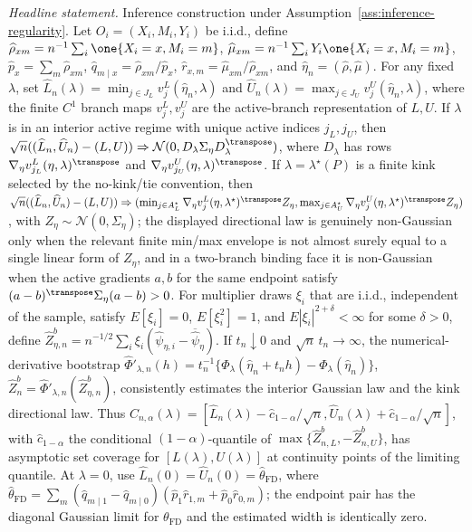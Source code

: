 \begin{proposition}\label{prop:inference-active-branch}
\emph{Headline statement.} Inference construction under Assumption~\ref{ass:inference-regularity}. Let \(O_i=(X_i,M_i,Y_i)\) be i.i.d., define \(\widehat\rho_{xm}=n^{-1}\sum_i\one\{X_i=x,M_i=m\}\), \(\widehat\mu_{xm}=n^{-1}\sum_iY_i\one\{X_i=x,M_i=m\}\), \(\widehat p_x=\sum_m\widehat\rho_{xm}\), \(\widehat q_{m\mid x}=\widehat\rho_{xm}/\widehat p_x\), \(\widehat r_{x,m}=\widehat\mu_{xm}/\widehat\rho_{xm}\), and \(\widehat\eta_n=(\widehat\rho,\widehat\mu)\). For any fixed \(\lambda\), set \(\widehat L_n(\lambda)=\min_{j\in J_L}v^L_j(\widehat\eta_n,\lambda)\) and \(\widehat U_n(\lambda)=\max_{j\in J_U}v^U_j(\widehat\eta_n,\lambda)\), where the finite \(C^1\) branch maps \(v^L_j,v^U_j\) are the active-branch representation of \(L,U\). If \(\lambda\) is in an interior active regime with unique active indices \(j_L,j_U\), then \(\sqrt n((\widehat L_n,\widehat U_n)-(L,U))\Rightarrow \mathcal N(0,D_\lambda\Sigma_\eta D_\lambda^\transpose)\), where \(D_\lambda\) has rows \(\nabla_\eta v^L_{j_L}(\eta,\lambda)^\transpose\) and \(\nabla_\eta v^U_{j_U}(\eta,\lambda)^\transpose\). If \(\lambda=\lambda^\star(P)\) is a finite kink selected by the no-kink/tie convention, then \(\sqrt n((\widehat L_n,\widehat U_n)-(L,U))\Rightarrow(\min_{j\in A_L^\star}\nabla_\eta v^L_j(\eta,\lambda^\star)^\transpose Z_\eta,\max_{j\in A_U^\star}\nabla_\eta v^U_j(\eta,\lambda^\star)^\transpose Z_\eta)\), with \(Z_\eta\sim\mathcal N(0,\Sigma_\eta)\); the displayed directional law is genuinely non-Gaussian only when the relevant finite min/max envelope is not almost surely equal to a single linear form of \(Z_\eta\), and in a two-branch binding face it is non-Gaussian when the active gradients \(a,b\) for the same endpoint satisfy \((a-b)^\transpose\Sigma_\eta(a-b)>0\). For multiplier draws \(\xi_i\) that are i.i.d., independent of the sample, satisfy \(E[\xi_i]=0\), \(E[\xi_i^2]=1\), and \(E|\xi_i|^{2+\delta}<\infty\) for some \(\delta>0\), define \(\widehat Z_{\eta,n}^b=n^{-1/2}\sum_i\xi_i(\widehat\psi_{\eta,i}-\overline{\widehat\psi}_\eta)\). If \(t_n\downarrow0\) and \(\sqrt n\,t_n\to\infty\), the numerical-derivative bootstrap \(\widehat\Phi'_{\lambda,n}(h)=t_n^{-1}\{\Phi_\lambda(\widehat\eta_n+t_nh)-\Phi_\lambda(\widehat\eta_n)\}\), \(\widehat Z_n^b=\widehat\Phi'_{\lambda,n}(\widehat Z_{\eta,n}^b)\), consistently estimates the interior Gaussian law and the kink directional law. Thus \(C_{n,\alpha}(\lambda)=[\widehat L_n(\lambda)-\widehat c_{1-\alpha}/\sqrt n,\widehat U_n(\lambda)+\widehat c_{1-\alpha}/\sqrt n]\), with \(\widehat c_{1-\alpha}\) the conditional \((1-\alpha)\)-quantile of \(\max\{\widehat Z_{n,L}^b,-\widehat Z_{n,U}^b\}\), has asymptotic set coverage for \([L(\lambda),U(\lambda)]\) at continuity points of the limiting quantile. At \(\lambda=0\), use \(\widehat L_n(0)=\widehat U_n(0)=\widehat\theta_{\mathrm{FD}}\), where \(\widehat\theta_{\mathrm{FD}}=\sum_m(\widehat q_{m\mid1}-\widehat q_{m\mid0})(\widehat p_1\widehat r_{1,m}+\widehat p_0\widehat r_{0,m})\); the endpoint pair has the diagonal Gaussian limit for \(\theta_{\mathrm{FD}}\) and the estimated width is identically zero.
\end{proposition}

